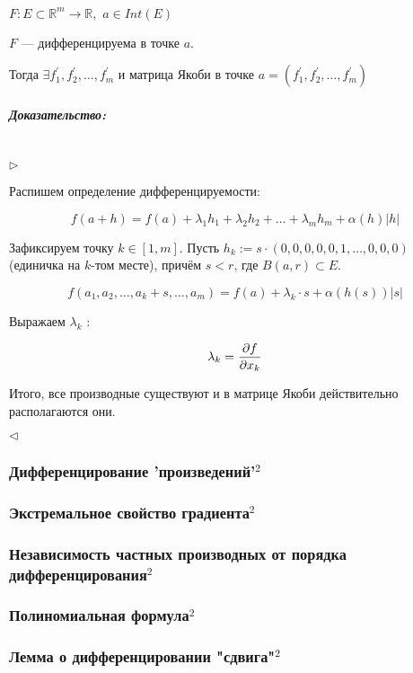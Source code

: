 \documentclass{article}
\def\dbl{\,\,}
\let\vanillasubparagraph\subparagraph
\renewcommand{\subparagraph}[1]{\vanillasubparagraph{#1}\mbox{}\\}
\begin{document}
$F: E \subset \mathbb{R}^m \rightarrow \mathbb{R}, \dbl a \in Int(E)$

$F$ --- дифференцируема в точке $a$.

Тогда $\exists f^\prime_1, f^\prime_2, \ldots, f^\prime_m$ и матрица Якоби в точке $a = (f^\prime_1, f^\prime_2, \ldots, f^\prime_m)$

\subparagraph{Доказательство: }

$\rhd$

Распишем определение дифференцируемости:

\[f(a + h) = f(a) + \lambda_1h_1 + \lambda_2h_2 + \ldots + \lambda_mh_m + \alpha(h)|h|\]

Зафиксируем точку $k \in [1, m]$. Пусть $h_k := s \cdot (0, 0, 0, 0, 0, 1, \ldots, 0, 0, 0)$ (единичка на $k$-том месте), причём $s < r$, где $B(a, r) \subset E$.

\[f(a_1, a_2, \ldots, a_k + s, \dots, a_m) = f(a) + \lambda_k \cdot s + \alpha(h(s))|s|\]

Выражаем $\lambda_k$ :

\[\lambda_k = \pdv{f}{x_k} (a)\]

Итого, все производные существуют и в матрице Якоби действительно располагаются они.

$\lhd$

\subsubsection{Дифференцирование 'произведений'\texorpdfstring{$^2$}{}}



\subsubsection{Экстремальное свойство градиента\texorpdfstring{$^2$}{}}



\subsubsection{Независимость частных производных от порядка дифференцирования\texorpdfstring{$^2$}{}}



\subsubsection{Полиномиальная формула\texorpdfstring{$^2$}{}}



\subsubsection{Лемма о дифференцировании "сдвига"\texorpdfstring{$^2$}{}}


\end{document}
